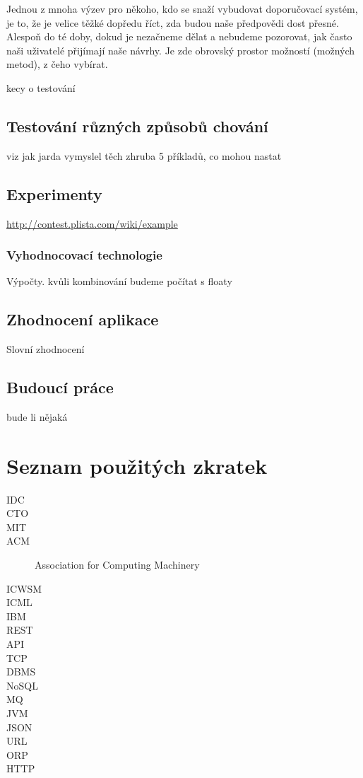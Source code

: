 \documentclass[thesis=M,czech]{FITthesis}[2014/05/07]
\begin{document}
Jednou z mnoha výzev pro někoho, kdo se snaží vybudovat doporučovací systém, je to, že je velice těžké dopředu říct, zda budou naše předpovědi dost přesné. Alespoň do té doby, dokud je nezačneme dělat a nebudeme pozorovat, jak často naši uživatelé přijímají naše návrhy. Je zde obrovský prostor možností (možných metod), z čeho vybírat. 

kecy o testování
\section{Testování různých způsobů chování}
viz jak jarda vymyslel těch zhruba 5 příkladů, co mohou nastat
\section{Experimenty}

\url{http://contest.plista.com/wiki/example}
	\subsection{Vyhodnocovací technologie}	
	Výpočty. kvůli kombinování budeme počítat s floaty
	

\section{Zhodnocení aplikace}
Slovní zhodnocení
\section{Budoucí práce}
bude li nějaká

\begin{conclusion}
\end{conclusion}




\appendix

\chapter{Seznam použitých zkratek}
\begin{description}
	\item[IDC] 
	\item[CTO]
	\item[MIT]	
	\item[ACM] Association for Computing Machinery	
	\item[ICWSM]	
	\item[ICML]	
	\item[IBM]	
	\item[REST]	
	\item[API]							
	\item[TCP]
	\item[DBMS]
	\item[NoSQL]
	\item[MQ]
	\item[JVM]
	\item[JSON]
	\item[URL]
	\item[ORP]
	\item[HTTP]
\end{description}
\end{document}

